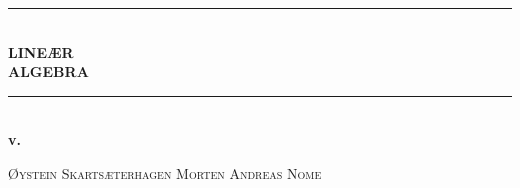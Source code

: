 \onecolumn
\thispagestyle{empty}
\hbox{}
\vspace{160pt}

\noindent

\begin{center}
\rule{420pt}{4pt}\\[4pt]
\fontsize{90pt}{70pt}\selectfont
\textbf{LINEÆR}\\
\fontsize{76pt}{70pt}\selectfont
\textbf{ALGEBRA}
\\[-50pt]
\rule{420pt}{4pt}
\\[30pt]
\Huge \textbf{v.~\versjon}
\end{center}

\vfill
\begin{center}
\begin{minipage}{420pt}
\LARGE
\textsc{Øystein Skartsæterhagen}
\hfill
\textsc{Morten Andreas Nome}
\end{minipage}
\end{center}

\vspace{40pt}

\twocolumn
